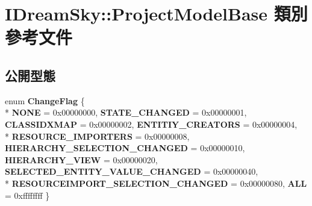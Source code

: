 \hypertarget{class_i_dream_sky_1_1_project_model_base}{}\section{I\+Dream\+Sky\+:\+:Project\+Model\+Base 類別 參考文件}
\label{class_i_dream_sky_1_1_project_model_base}
\subsection*{公開型態}
\begin{DoxyCompactItemize}
\item 
enum {\bfseries Change\+Flag} \{ \\*
{\bfseries N\+O\+NE} = 0x00000000, 
{\bfseries S\+T\+A\+T\+E\+\_\+\+C\+H\+A\+N\+G\+ED} = 0x00000001, 
{\bfseries C\+L\+A\+S\+S\+I\+D\+X\+M\+AP} = 0x00000002, 
{\bfseries E\+N\+T\+I\+T\+I\+Y\+\_\+\+C\+R\+E\+A\+T\+O\+RS} = 0x00000004, 
\\*
{\bfseries R\+E\+S\+O\+U\+R\+C\+E\+\_\+\+I\+M\+P\+O\+R\+T\+E\+RS} = 0x00000008, 
{\bfseries H\+I\+E\+R\+A\+R\+C\+H\+Y\+\_\+\+S\+E\+L\+E\+C\+T\+I\+O\+N\+\_\+\+C\+H\+A\+N\+G\+ED} = 0x00000010, 
{\bfseries H\+I\+E\+R\+A\+R\+C\+H\+Y\+\_\+\+V\+I\+EW} = 0x00000020, 
{\bfseries S\+E\+L\+E\+C\+T\+E\+D\+\_\+\+E\+N\+T\+I\+T\+Y\+\_\+\+V\+A\+L\+U\+E\+\_\+\+C\+H\+A\+N\+G\+ED} = 0x00000040, 
\\*
{\bfseries R\+E\+S\+O\+U\+R\+C\+E\+I\+M\+P\+O\+R\+T\+\_\+\+S\+E\+L\+E\+C\+T\+I\+O\+N\+\_\+\+C\+H\+A\+N\+G\+ED} = 0x00000080, 
{\bfseries A\+LL} = 0xffffffff
 \}\hypertarget{class_i_dream_sky_1_1_project_model_base_aadbd15a339c35df7eceba14fb4de5d53}{}\label{class_i_dream_sky_1_1_project_model_base_aadbd15a339c35df7eceba14fb4de5d53}

\end{DoxyCompactItemize}
